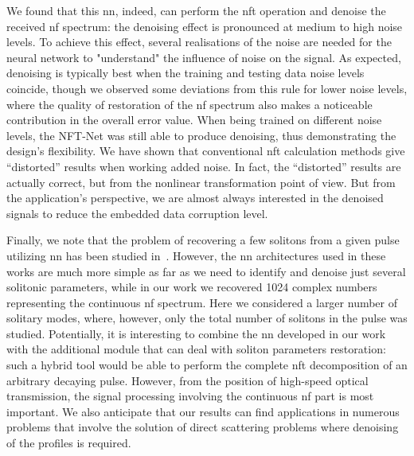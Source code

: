 We found that this \acrshort{nn}, indeed, can perform the \acrshort{nft} operation and denoise the received \acrshort{nf} spectrum: the denoising effect is pronounced at medium to high noise levels. 
To achieve this effect, several realisations of the noise are needed for the neural network to "understand" the influence of noise on the signal. 
As expected, denoising is typically best when the training and testing data noise levels coincide, though we observed some deviations from this rule for lower noise levels, where the quality of restoration of the \acrshort{nf} spectrum also makes a noticeable contribution in the overall error value. When being trained on different noise levels, the NFT-Net was still able to produce denoising, thus demonstrating the design's flexibility. We have shown that conventional \acrshort{nft} calculation methods give ``distorted'' results when working added noise. In fact, the ``distorted'' results are actually correct, but from the nonlinear transformation point of view. But from the application's perspective, we are almost always interested in the denoised signals to reduce the embedded data corruption level.

Finally, we note that the problem of recovering a few solitons from a given pulse utilizing \acrshort{nn} has been studied in~\cite{jgy18,ymm19,wxz20,mishina2021eigenvalue}. However, the \acrshort{nn} architectures used in these works are much more simple as far as we need to identify and denoise just several solitonic parameters, while in our work we recovered 1024 complex numbers representing the continuous \acrshort{nf} spectrum. Here we considered a larger number of solitary modes, where, however, only the total number of solitons in the pulse was studied. 
Potentially, it is interesting to combine the \acrshort{nn} developed in our work with the additional module that can deal with soliton parameters restoration: such a hybrid tool would be able to perform the complete \acrshort{nft} decomposition of an arbitrary decaying pulse. However, from the position of high-speed optical transmission, the signal processing involving the continuous \acrshort{nf} part is most important. We also anticipate that our results can find applications in numerous problems that involve the solution of direct scattering problems where denoising of the profiles is required.

